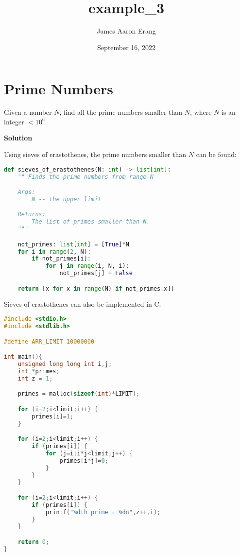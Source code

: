 \documentclass[12pt, UTF8]{article}
\title{example\_3}
\author{James Aaron Erang}
\date{September 16, 2022}
\begin{document}
	\maketitle
	
	\section*{Prime Numbers}
	
	Given a number $N$, find all the prime numbers smaller than $N$, where $N$ is an integer $< 10^6$.
	
	\textbf{Solution}
	
	Using sieves of erastothenes, the prime numbers smaller than $N$ can be found:
	
\begin{lstlisting}[language=Python]
def sieves_of_erastothenes(N: int) -> list[int]:
    """Finds the prime numbers from range N

    Args:
        N -- the upper limit

    Returns:
        The list of primes smaller than N.
    """

    not_primes: list[int] = [True]*N
    for i in range(2, N):
        if not_primes[i]:
            for j in range(i, N, i):
                not_primes[j] = False

    return [x for x in range(N) if not_primes[x]]
\end{lstlisting}
	
	Sieves of erastothenes can also be implemented in C:
	
\begin{lstlisting}[language=C]
#include <stdio.h>
#include <stdlib.h>

#define ARR_LIMIT 10000000

int main(){
    unsigned long long int i,j;
    int *primes;
    int z = 1;

    primes = malloc(sizeof(int)*LIMIT);

    for (i=2;i<limit;i++) {
        primes[i]=1;
    }

    for (i=2;i<limit;i++) {
        if (primes[i]) {
            for (j=i;i*j<limit;j++) {
                primes[i*j]=0;
            }
        }
    }

    for (i=2;i<limit;i++) {
        if (primes[i]) {
            printf("%dth prime = %dn",z++,i);
        }
    }

    return 0;
}
\end{lstlisting}
\end{document}

